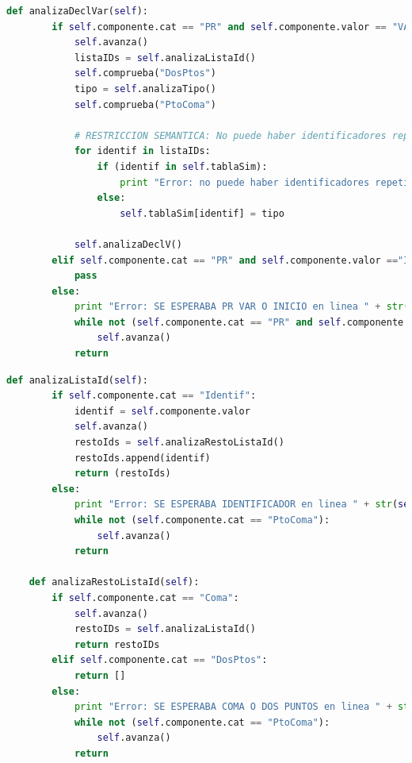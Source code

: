 \documentclass[11pt]{article}
\begin{document}
\begin{minipage}{\linewidth}
	\begin{lstlisting}[language=Python, caption=analizaDeclVar()]
	def analizaDeclVar(self):
        if self.componente.cat == "PR" and self.componente.valor == "VAR":
            self.avanza()
            listaIDs = self.analizaListaId()
            self.comprueba("DosPtos")
            tipo = self.analizaTipo()
            self.comprueba("PtoComa")

            # RESTRICCION SEMANTICA: No puede haber identificadores repetidos
            for identif in listaIDs:
                if (identif in self.tablaSim):
                    print "Error: no puede haber identificadores repetidos. ID repetido: " + str(identif)
                else:
                    self.tablaSim[identif] = tipo

            self.analizaDeclV()
        elif self.componente.cat == "PR" and self.componente.valor =="INICIO" :
            pass
        else:
            print "Error: SE ESPERABA PR VAR O INICIO en linea " + str(self.lexico.nlinea)
            while not (self.componente.cat == "PR" and self.componente.valor == "INICIO"):
                self.avanza()
            return
	\end{lstlisting}
\end{minipage}
\newpage
\begin{minipage}{\linewidth}

	\begin{lstlisting}[language=Python, caption=analizaListaId() y analizaRestoListaId()]
	def analizaListaId(self):
        if self.componente.cat == "Identif":
            identif = self.componente.valor
            self.avanza()
            restoIds = self.analizaRestoListaId()
            restoIds.append(identif)
            return (restoIds)
        else:
            print "Error: SE ESPERABA IDENTIFICADOR en linea " + str(self.lexico.nlinea)
            while not (self.componente.cat == "PtoComa"):
                self.avanza()
            return
    
    def analizaRestoListaId(self):
        if self.componente.cat == "Coma":
            self.avanza()
            restoIDs = self.analizaListaId()
            return restoIDs
        elif self.componente.cat == "DosPtos":
            return []
        else:
            print "Error: SE ESPERABA COMA O DOS PUNTOS en linea " + str(self.lexico.nlinea)
            while not (self.componente.cat == "PtoComa"):
                self.avanza()
            return
     \end{lstlisting}
\end{minipage}
\end{document}
